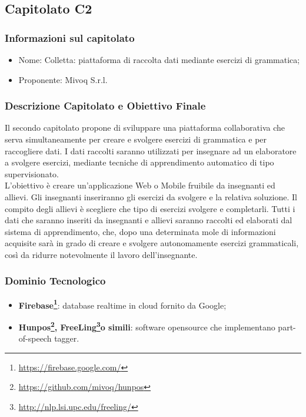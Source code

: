 \subsection{Capitolato C2}\label{C2}

\subsubsection{Informazioni sul capitolato}

\begin{itemize}
	\item Nome: Colletta: piattaforma di raccolta dati mediante esercizi di grammatica;
	\item Proponente: Mivoq S.r.l.
\end{itemize}

\subsubsection{Descrizione Capitolato e Obiettivo Finale}
Il secondo capitolato propone di sviluppare una piattaforma collaborativa che serva simultaneamente per 
creare e svolgere esercizi di grammatica e per raccogliere dati. I dati raccolti saranno utilizzati per insegnare ad un elaboratore a svolgere esercizi, mediante tecniche di apprendimento automatico di tipo supervisionato\glossario.\\
L'obiettivo è creare un'applicazione Web o Mobile fruibile da insegnanti ed allievi. Gli insegnanti inseriranno gli esercizi da svolgere e la relativa soluzione. Il compito degli allievi è scegliere che tipo di esercizi svolgere e completarli. Tutti i dati che saranno inseriti da insegnanti e allievi saranno raccolti ed elaborati dal sistema di apprendimento, che, dopo una determinata mole di informazioni acquisite sarà in grado di creare e svolgere autonomamente esercizi grammaticali, così da ridurre notevolmente il lavoro dell'insegnante.

\subsubsection{Dominio Tecnologico}\label{C2_DomTec}
\begin{itemize}
	\item \textbf{Firebase\footnote{\url{https://firebase.google.com/}}\glossario}: database realtime in cloud fornito da Google;
	\item \textbf{Hunpos\footnote{\url{https://github.com/mivoq/hunpos}}\glossario, FreeLing\footnote{\url{http://nlp.lsi.upc.edu/freeling/}}\glossario o simili}: software opensource che implementano part-of-speech tagger\glossario.
\end{itemize}

